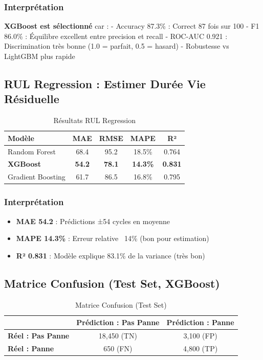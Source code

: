 \documentclass[12pt,a4paper,french]{article}
\begin{document}
\subsubsection{Interprétation}

\textbf{XGBoost est sélectionné} car :
- Accuracy 87.3\% : Correct 87 fois sur 100
- F1 86.0\% : Équilibre excellent entre precision et recall
- ROC-AUC 0.921 : Discrimination très bonne (1.0 = parfait, 0.5 = hasard)
- Robustesse vs LightGBM plus rapide

\subsection{RUL Regression : Estimer Durée Vie Résiduelle}

\begin{table}[H]
\centering
\small
\begin{tabular}{|l|c|c|c|c|}
\hline
\textbf{Modèle} & \textbf{MAE} & \textbf{RMSE} & \textbf{MAPE} & \textbf{R²} \\
\hline
Random Forest & 68.4 & 95.2 & 18.5\% & 0.764 \\
\textbf{XGBoost} & \textbf{54.2} & \textbf{78.1} & \textbf{14.3\%} & \textbf{0.831} \\
Gradient Boosting & 61.7 & 86.5 & 16.8\% & 0.795 \\
\hline
\end{tabular}
\caption{Résultats RUL Regression}
\end{table}

\subsubsection{Interprétation}

\begin{itemize}
    \item \textbf{MAE 54.2} : Prédictions ±54 cycles en moyenne
    \item \textbf{MAPE 14.3\%} : Erreur relative ~14\% (bon pour estimation)
    \item \textbf{R² 0.831} : Modèle explique 83.1\% de la variance (très bon)
\end{itemize}

\subsection{Matrice Confusion (Test Set, XGBoost)}

\begin{table}[H]
\centering
\begin{tabular}{|l|c|c|}
\hline
 & \textbf{Prédiction : Pas Panne} & \textbf{Prédiction : Panne} \\
\hline
\textbf{Réel : Pas Panne} & 18,450 (TN) & 3,100 (FP) \\
\textbf{Réel : Panne} & 650 (FN) & 4,800 (TP) \\
\hline
\end{tabular}
\caption{Matrice Confusion (Test Set)}
\end{table}
\end{document}
